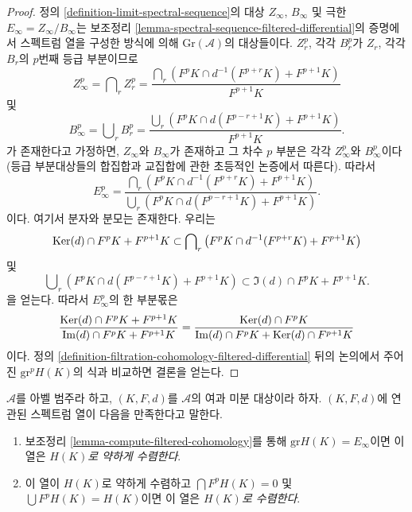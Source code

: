 \begin{proof}
정의 \ref{definition-limit-spectral-sequence}의 대상 $Z_\infty$,
$B_\infty$ 및 극한 $E_\infty = Z_\infty/B_\infty$는 보조정리
\ref{lemma-spectral-sequence-filtered-differential}의 증명에서 스펙트럼
열을 구성한 방식에 의해 $\text{Gr}(\mathcal{A})$의 대상들이다.
$Z_r^p$, 각각 $B_r^p$가 $Z_r$, 각각 $B_r$의 $p$번째 등급 부분이므로
$$
Z_\infty^p = \bigcap\nolimits_r Z_r^p =
\frac{\bigcap_r (F^pK \cap d^{-1}(F^{p + r}K) + F^{p + 1}K)}{F^{p + 1}K}
$$
및
$$
B_\infty^p = \bigcup\nolimits_r B_r^p =
\frac{\bigcup_r (F^pK \cap d(F^{p - r + 1}K) + F^{p + 1}K)}{F^{p + 1}K}.
$$
가 존재한다고 가정하면, $Z_\infty$와 $B_\infty$가 존재하고 그 차수
$p$ 부분은 각각 $Z_\infty^p$와 $B_\infty^p$이다(등급 부분대상들의
합집합과 교집합에 관한 초등적인 논증에서 따른다). 따라서
$$
E_\infty^p =
\frac{\bigcap_r (F^pK \cap d^{-1}(F^{p + r}K) + F^{p + 1}K)}
{\bigcup_r (F^pK \cap d(F^{p - r + 1}K) + F^{p + 1}K)}.
$$
이다. 여기서 분자와 분모는 존재한다.
우리는
\begin{equation}
\label{equation-on-top}
\mathop{\mathrm{Ker}}(d) \cap F^pK + F^{p + 1}K
\subset
\bigcap\nolimits_r \left(F^pK \cap d^{-1}(F^{p + r}K) + F^{p + 1}K\right)
\end{equation}
및
\begin{equation}
\label{equation-at-bottom}
\bigcup\nolimits_r \left(F^pK \cap d(F^{p - r + 1}K) + F^{p + 1}K\right)
\subset
\Im(d) \cap F^pK + F^{p + 1}K.
\end{equation}
을 얻는다. 따라서 $E_\infty^p$의 한 부분몫은
$$
\frac{\mathop{\mathrm{Ker}}(d) \cap F^pK + F^{p + 1}K}{\mathop{\mathrm{Im}}(d) \cap F^pK + F^{p + 1}K} =
\frac{\mathop{\mathrm{Ker}}(d) \cap F^pK}{\mathop{\mathrm{Im}}(d) \cap F^pK + \mathop{\mathrm{Ker}}(d) \cap F^{p + 1}K}
$$
이다. 정의 \ref{definition-filtration-cohomology-filtered-differential}
뒤의 논의에서 주어진 $\text{gr}^pH(K)$의 식과 비교하면 결론을 얻는다.
\end{proof}

\begin{definition}
\label{definition-filtered-differential-ss-converges}
$\mathcal{A}$를 아벨 범주라 하고, $(K, F, d)$를 $\mathcal{A}$의 여과
미분 대상이라 하자. $(K, F, d)$에 연관된 스펙트럼 열이 다음을
만족한다고 말한다.
\begin{enumerate}
\item 보조정리 \ref{lemma-compute-filtered-cohomology}를 통해
$\text{gr}H(K) = E_{\infty}$이면 이 열은
{\it $H(K)$로 약하게 수렴한다}.
\item 이 열이 $H(K)$로 약하게 수렴하고
$\bigcap F^pH(K) = 0$ 및 $\bigcup F^pH(K) = H(K)$이면 이 열은
{\it $H(K)$로 수렴한다}.
\end{enumerate}
\end{definition}

